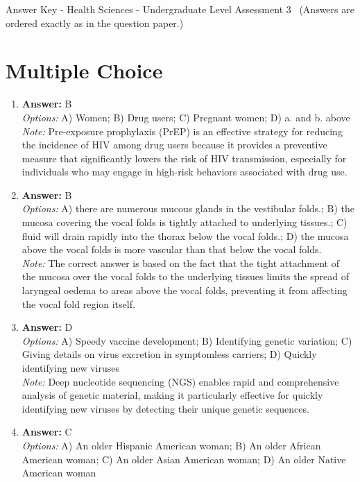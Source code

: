 \documentclass[12pt]{article}
\begin{document}
\begin{center}
Answer Key - Health Sciences - Undergraduate Level Assessment 3 \
\small (Answers are ordered exactly as in the question paper.)
\end{center}

\section*{Multiple Choice}
\begin{enumerate}[label=\arabic*.]
\item \textbf{Answer:} B
\\ \textit{Options:} A) Women; B) Drug users; C) Pregnant women; D) a. and b. above
\\ \textit{Note:} Pre-exposure prophylaxis (PrEP) is an effective strategy for reducing the incidence of HIV among drug users because it provides a preventive measure that significantly lowers the risk of HIV transmission, especially for individuals who may engage in high-risk behaviors associated with drug use.
\item \textbf{Answer:} B
\\ \textit{Options:} A) there are numerous mucous glands in the vestibular folds.; B) the mucosa covering the vocal folds is tightly attached to underlying tissues.; C) fluid will drain rapidly into the thorax below the vocal folds.; D) the mucosa above the vocal folds is more vascular than that below the vocal folds.
\\ \textit{Note:} The correct answer is based on the fact that the tight attachment of the mucosa over the vocal folds to the underlying tissues limits the spread of laryngeal oedema to areas above the vocal folds, preventing it from affecting the vocal fold region itself.
\item \textbf{Answer:} D
\\ \textit{Options:} A) Speedy vaccine development; B) Identifying genetic variation; C) Giving details on virus excretion in symptomless carriers; D) Quickly identifying new viruses
\\ \textit{Note:} Deep nucleotide sequencing (NGS) enables rapid and comprehensive analysis of genetic material, making it particularly effective for quickly identifying new viruses by detecting their unique genetic sequences.
\item \textbf{Answer:} C
\\ \textit{Options:} A) An older Hispanic American woman; B) An older African American woman; C) An older Asian American woman; D) An older Native American woman

\end{enumerate}
\end{document}
